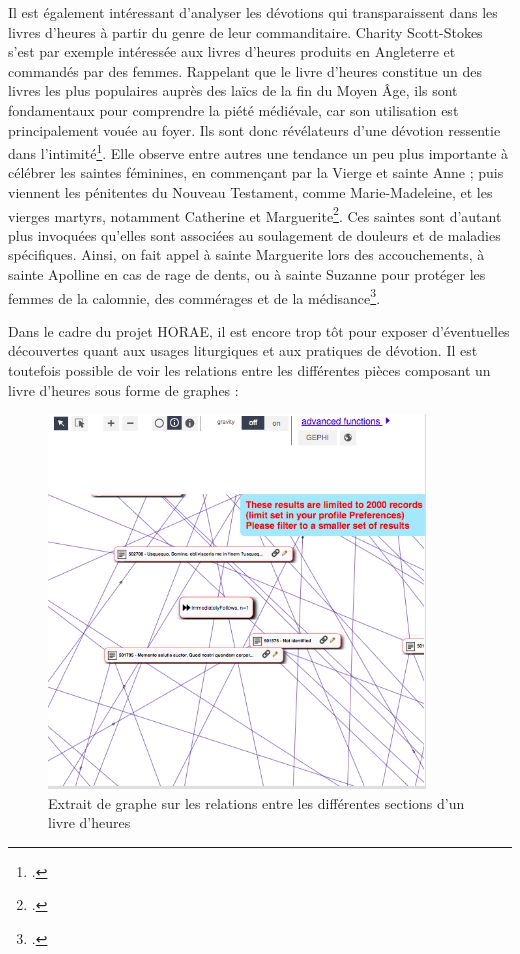 \documentclass[a4paper,12pt,twoside]{book}
\begin{document}
Il est également intéressant d'analyser les dévotions qui transparaissent dans les livres d'heures à partir du genre de leur commanditaire. Charity Scott-Stokes s'est par exemple intéressée aux livres d'heures produits en Angleterre et commandés par des femmes. Rappelant que le livre d'heures constitue un des livres les plus populaires auprès des laïcs de la fin du Moyen Âge, ils sont fondamentaux pour comprendre la piété médiévale, car son utilisation est principalement vouée au foyer. Ils sont donc révélateurs d'une dévotion ressentie dans l'intimité\footcite[p. 1]{Women_Books_Hours}. Elle observe entre autres une tendance un peu plus importante à célébrer les saintes féminines, en commençant par la Vierge et sainte Anne ; puis viennent les pénitentes du Nouveau Testament, comme Marie-Madeleine, et les vierges martyrs, notamment Catherine et Marguerite\footcite[p. 14]{Women_Books_Hours}. Ces saintes sont d'autant plus invoquées qu'elles sont associées au soulagement de douleurs et de maladies spécifiques. Ainsi, on fait appel à sainte Marguerite lors des accouchements, à sainte Apolline en cas de rage de dents, ou à sainte Suzanne pour protéger les femmes de la calomnie, des commérages et de la médisance\footcite[p. 15]{Women_Books_Hours}. 

Dans le cadre du projet HORAE, il est encore trop tôt pour exposer d'éventuelles découvertes quant aux usages liturgiques et aux pratiques de dévotion. Il est toutefois possible de voir les relations entre les différentes pièces composant un livre d'heures sous forme de graphes : 
    \begin{figure}[!h]
    \centering
    \includegraphics[width=10cm]{img/DataViz/réseau_section_livres_heures.png}
    \caption{Extrait de graphe sur les relations entre les différentes sections d'un livre d'heures}
    \end{figure}
    \clearpage
\end{document}
